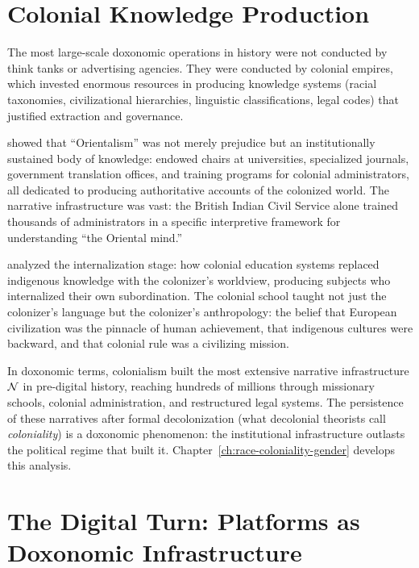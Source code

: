\section{Colonial Knowledge Production}
\label{sec:ch3-colonial}

The most large-scale doxonomic operations in history were not conducted by think tanks or advertising agencies.
They were conducted by colonial empires, which invested enormous resources in producing knowledge systems (racial taxonomies, civilizational hierarchies, linguistic classifications, legal codes) that justified extraction and governance.

\textcite{said1978} showed that ``Orientalism'' was not merely prejudice but an institutionally sustained body of knowledge: endowed chairs at universities, specialized journals, government translation offices, and training programs for colonial administrators, all dedicated to producing authoritative accounts of the colonized world.
The narrative infrastructure was vast: the British Indian Civil Service alone trained thousands of administrators in a specific interpretive framework for understanding ``the Oriental mind.''

\textcite{fanon1961} analyzed the internalization stage: how colonial education systems replaced indigenous knowledge with the colonizer's worldview, producing subjects who internalized their own subordination.
The colonial school taught not just the colonizer's language but the colonizer's anthropology: the belief that European civilization was the pinnacle of human achievement, that indigenous cultures were backward, and that colonial rule was a civilizing mission.

In doxonomic terms, colonialism built the most extensive narrative infrastructure $\mathcal{N}$ in pre-digital history, reaching hundreds of millions through missionary schools, colonial administration, and restructured legal systems.
The persistence of these narratives after formal decolonization (what decolonial theorists call \emph{coloniality}) is a doxonomic phenomenon: the institutional infrastructure outlasts the political regime that built it.
Chapter~\ref{ch:race-coloniality-gender} develops this analysis.


\section{The Digital Turn: Platforms as Doxonomic Infrastructure}
\label{sec:ch3-digital}


